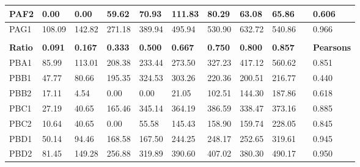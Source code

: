 \begin{tabular}{|l|l|l|l|l|l|l|l|l|l|l|}
PAF2           & 0.00           & 0.00           & 59.62          & 70.93          & 111.83         & 80.29          & 63.08          & 65.86          &                  & 0.606             \\ \hline
PAG1           & 108.09         & 142.82         & 271.18         & 389.94         & 495.94         & 530.90         & 632.72         & 540.86         &                  & 0.966             \\ \hline
               &                &                &                &                &                &                &                &                &                  &                   \\ \hline
\textbf{Ratio} & \textbf{0.091} & \textbf{0.167} & \textbf{0.333} & \textbf{0.500} & \textbf{0.667} & \textbf{0.750} & \textbf{0.800} & \textbf{0.857} &                  & \textbf{Pearsons} \\ \hline
PBA1           & 85.99          & 113.01         & 208.38         & 233.44         & 273.50         & 327.23         & 417.12         & 560.62         &                  & 0.851             \\ \hline
PBB1           & 47.77          & 80.66          & 195.35         & 324.53         & 303.26         & 220.36         & 200.51         & 216.77         &                  & 0.440             \\ \hline
PBB2           & 17.11          & 4.54           & 0.00           & 0.00           & 21.05          & 102.51         & 144.30         & 187.86         &                  & 0.618             \\ \hline
PBC1           & 27.19          & 40.65          & 165.46         & 345.14         & 364.19         & 386.59         & 338.47         & 373.16         &                  & 0.885             \\ \hline
PBC2           & 10.64          & 40.65          & 0.00           & 55.58          & 145.43         & 158.90         & 159.74         & 228.05         &                  & 0.845             \\ \hline
PBD1           & 50.14          & 94.46          & 168.58         & 167.50         & 244.25         & 248.17         & 252.65         & 319.61         &                  & 0.945             \\ \hline
PBD2           & 81.45          & 149.28         & 256.88         & 319.89         & 390.60         & 407.02         & 380.30         & 490.17         &                  & 0.950             \\ \hline

\end{tabular}
